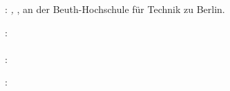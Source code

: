 
\thispagestyle{empty}

\hfill

\vfill

\noindent\myName: \textit{\myTitle,} \mySubtitle, an der Beuth-Hochschule f\"{u}r Technik zu Berlin.%
\textcopyright\ \myTime



\noindent{}: \\
\myProf \\
\noindent{}: \\
\mySupervisor


\noindent{}: \\
\myLocation


